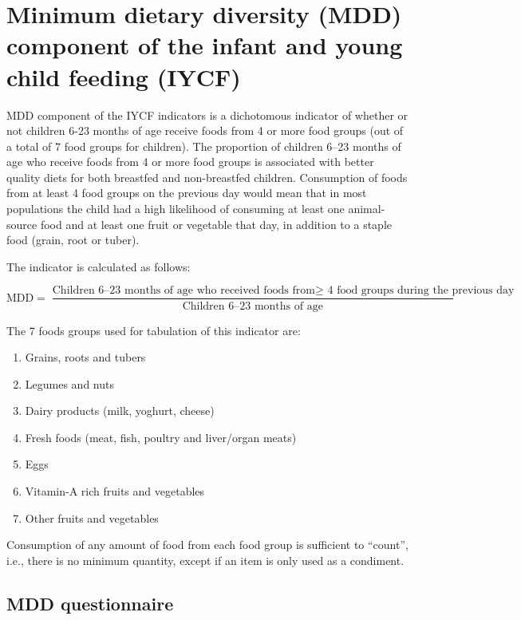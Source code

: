 \documentclass[12pt,]{book}
\providecommand{\tightlist}{%
  \setlength{\itemsep}{0pt}\setlength{\parskip}{0pt}}
\theoremstyle{definition}
\theoremstyle{definition}
\theoremstyle{definition}
\theoremstyle{remark}
\begin{document}
\hypertarget{minimum-dietary-diversity-mdd-component-of-the-infant-and-young-child-feeding-iycf}{%
\section{Minimum dietary diversity (MDD) component of the infant and
young child feeding
(IYCF)}\label{minimum-dietary-diversity-mdd-component-of-the-infant-and-young-child-feeding-iycf}}

MDD component of the IYCF indicators is a dichotomous indicator of
whether or not children 6-23 months of age receive foods from 4 or more
food groups (out of a total of 7 food groups for children). The
proportion of children 6--23 months of age who receive foods from 4 or
more food groups is associated with better quality diets for both
breastfed and non-breastfed children. Consumption of foods from at least
4 food groups on the previous day would mean that in most populations
the child had a high likelihood of consuming at least one animal-source
food and at least one fruit or vegetable that day, in addition to a
staple food (grain, root or tuber).

The indicator is calculated as follows:

\[ \text{MDD} = \frac{\text{Children 6–23 months of age who received foods from} \geq \text{ 4 food groups during the previous day}}{\text{Children 6–23 months of age}} \]

The 7 foods groups used for tabulation of this indicator are:

\begin{enumerate}
\def\labelenumi{\arabic{enumi}.}
\tightlist
\item
  Grains, roots and tubers
\item
  Legumes and nuts
\item
  Dairy products (milk, yoghurt, cheese)
\item
  Fresh foods (meat, fish, poultry and liver/organ meats)
\item
  Eggs
\item
  Vitamin-A rich fruits and vegetables
\item
  Other fruits and vegetables
\end{enumerate}

Consumption of any amount of food from each food group is sufficient to
``count'', i.e., there is no minimum quantity, except if an item is only
used as a condiment.

\hypertarget{mdd-questionnaire}{%
\subsection{MDD questionnaire}\label{mdd-questionnaire}}
\end{document}
